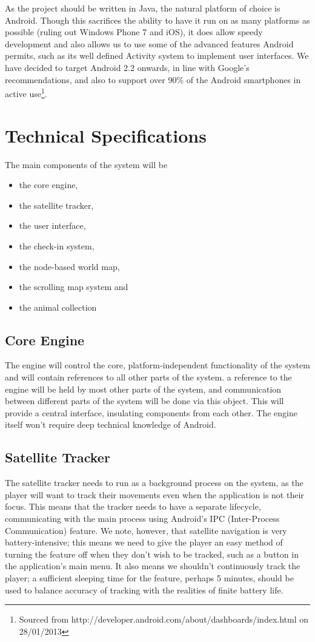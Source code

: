 \documentclass[12pt,a4paper,twoside]{article}
\begin{document}
As the project should be written in Java, the natural platform of choice is Android.
Though this sacrifices the ability to have it run on as many platforms as possible (ruling out Windows Phone 7 and iOS), it does allow speedy development and also allows us to use some of the advanced features Android permits, such as its well defined Activity system to implement user interfaces.
We have decided to target Android 2.2 onwards, in line with Google's recommendations, and also to support over 90\% of the Android smartphones in active use\footnote{Sourced from http://developer.android.com/about/dashboards/index.html on 28/01/2013}.

\section{Technical Specifications}
The main components of the system will be
\begin{itemize}
\item the core engine,
\item the satellite tracker,
\item the user interface,
\item the check-in system,
\item the node-based world map,
\item the scrolling map system and
\item the animal collection
\end{itemize}

\subsection{Core Engine}
The engine will control the core, platform-independent functionality of the system and will contain references to all other parts of the system.
a reference to the engine will be held by most other parts of the system, and communication between different parts of the system will be done via this object.
This will provide a central interface, insulating components from each other.
The engine itself won't require deep technical knowledge of Android.

\subsection{Satellite Tracker}
The satellite tracker needs to run as a background process on the system, as the player will want to track their movements even when the application is not their focus.
This means that the tracker needs to have a separate lifecycle, communicating with the main process using Android's IPC (Inter-Process Communication) feature.
We note, however, that satellite navigation is very battery-intensive; this means we need to give the player an easy method of turning the feature off when they don't wish to be tracked, such as a button in the application's main menu.
It also means we shouldn't continuously track the player; a sufficient sleeping time for the feature, perhaps 5 minutes, should be used to balance accuracy of tracking with the realities of finite battery life.
\end{document}
